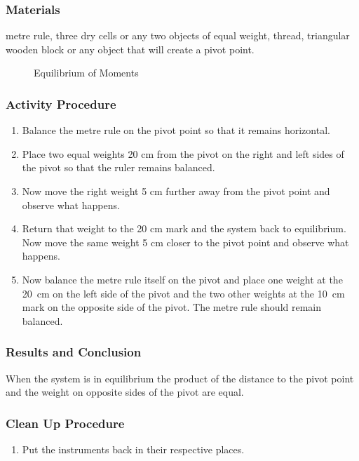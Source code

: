 \subsubsection*{Materials}
metre rule, three dry cells or any two objects of equal weight, thread, triangular wooden block or any object that will create a pivot point.  

\begin{figure}[h]
\begin{center}
\def\svgwidth{200pt}

\caption{Equilibrium of Moments}
\label{fig:equilibrium-moment}
\end{center}
\end{figure}

\subsubsection*{Activity Procedure}
\begin{enumerate}
\item{Balance the metre rule on the pivot point so that it remains horizontal.} 
\item{Place two equal weights 20 cm from the pivot on the right and left sides of the pivot so that the ruler remains balanced.} 
\item{Now move the right weight 5 cm further away from the pivot point and observe what happens.} 
\item{Return that weight to the 20 cm mark and the system back to equilibrium. Now move the same weight 5 cm closer to the pivot point and observe what happens.} 
\item{Now balance the metre rule itself on the pivot and place one weight at the 20~cm on the left side of the pivot and the two other weights at the 10~cm mark on the opposite side of the pivot. The metre rule should remain balanced.} 
\end{enumerate}

\subsubsection*{Results and Conclusion}
When the system is in equilibrium the product of the distance to the pivot point and the weight on opposite sides of the pivot are equal.  

\subsubsection*{Clean Up Procedure}
\begin{enumerate}
\item{Put the instruments back in their respective places.} 
\end{enumerate}

